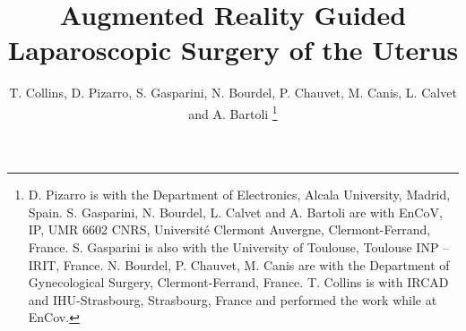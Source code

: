 \documentclass[journal]{IEEEtran}
\begin{document}
\title{Augmented Reality Guided \\Laparoscopic Surgery of the Uterus}
%
%
%

\author{T. Collins, D. Pizarro, S. Gasparini, N. Bourdel, P. Chauvet, M. Canis, L. Calvet and A. Bartoli%
\thanks{D. Pizarro is with the Department of Electronics, Alcala University, Madrid, Spain. S. Gasparini, N. Bourdel, L. Calvet and A. Bartoli are with EnCoV, IP, UMR 6602 CNRS, Universit\'{e} Clermont Auvergne, Clermont-Ferrand, France. S. Gasparini is also with the University of Toulouse, Toulouse INP -- IRIT, France.  N. Bourdel, P. Chauvet, M. Canis are with the Department of Gynecological Surgery, Clermont-Ferrand, France. T. Collins is with IRCAD and IHU-Strasbourg, Strasbourg, France and performed the work while at EnCov.}%
}

% 
%



% 
\end{document}
